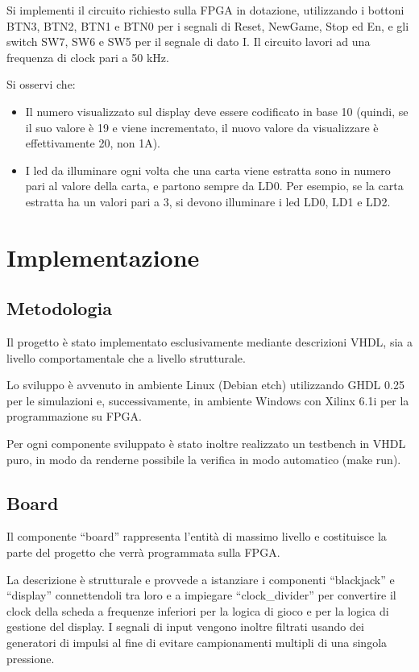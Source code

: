 \documentclass [11pt,a4paper,oneside,draft]{article}
\begin{document}
Si implementi il circuito richiesto sulla FPGA in dotazione, utilizzando i bottoni BTN3,
BTN2, BTN1 e BTN0 per i segnali di Reset, NewGame, Stop ed En, e gli switch
SW7, SW6 e SW5 per il segnale di dato I. Il circuito lavori ad una frequenza di clock
pari a 50 kHz.

Si osservi che:
\begin{itemize}
\item Il numero visualizzato sul display deve essere codificato in base 10 (quindi, se
      il suo valore è 19 e viene incrementato, il nuovo valore da visualizzare è
      effettivamente 20, non 1A).

\item I led da illuminare ogni volta che una carta viene estratta sono in numero pari
      al valore della carta, e partono sempre da LD0. Per esempio, se la carta
      estratta ha un valori pari a 3, si devono illuminare i led LD0, LD1 e LD2.
\end{itemize}


\section{Implementazione}
\subsection{Metodologia}
Il progetto è stato implementato esclusivamente mediante descrizioni VHDL, sia a
livello comportamentale che a livello strutturale.

Lo sviluppo è avvenuto in ambiente Linux (Debian etch) utilizzando GHDL 0.25 per le
simulazioni e, successivamente, in ambiente Windows con Xilinx 6.1i per la
programmazione su FPGA.

Per ogni componente sviluppato è stato inoltre realizzato un testbench in VHDL 
puro, in modo da renderne possibile la verifica in modo automatico (make run). %

\subsection{Board}
Il componente ``board'' rappresenta l'entità di massimo livello e costituisce
la parte del progetto che verrà programmata sulla FPGA.



La descrizione è strutturale e provvede a istanziare i componenti ``blackjack''
e ``display'' connettendoli tra loro e a impiegare ``clock\_divider'' per 
convertire il clock della scheda a frequenze inferiori per la logica di 
gioco e per la logica di gestione del display. I segnali di input vengono 
inoltre filtrati usando dei generatori di impulsi al fine di evitare 
campionamenti multipli di una singola pressione.
\end{document}
